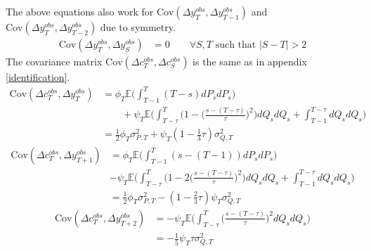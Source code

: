 The above equations also work for $\mathrm{Cov}(\Delta y^{obs}_T, \Delta y^{obs}_{T-1})$ and $\mathrm{Cov}(\Delta y^{obs}_T, \Delta y^{obs}_{T-2})$ due to symmetry.
\begin{align}
\mathrm{Cov}(\Delta y^{obs}_T, \Delta y^{obs}_{S}) &= 0 \qquad \forall S,T \text{ such that }|S-T| >2 
\end{align}
The covariance matrix $\mathrm{Cov}(\Delta c^{obs}_T, \Delta c^{obs}_{S})$ is the same as in appendix \ref{identification}.
\begin{align}
\mathrm{Cov}(\Delta c^{obs}_T, \Delta y^{obs}_T) &= \phi_T \mathbb{E} \Big(  \int_{T-1}^{T} (T-s) dP_s dP_s \Big) \nonumber \\
& \qquad +  \psi_T \mathbb{E} \Big(\int_{T-\tau}^{T} \Big( 1 - \Big(\frac{s-(T-\tau)}{\tau}\Big)^2\Big) dQ_s dQ_s  + \int_{T-1}^{T-\tau} dQ_s dQ_s\Big) \nonumber \\
&= \frac{1}{2} \phi_T \sigma^2_{P,T} + \psi_T  (1-\frac{1}{3}\tau )\sigma^2_{Q,T} 
\end{align}
\begin{align}
\mathrm{Cov}(\Delta c^{obs}_T, \Delta y^{obs}_{T+1}) &=  \phi_T \mathbb{E} \Big(  \int_{T-1}^{T} (s-(T-1)) dP_s dP_s \Big) \nonumber \\
&  -\psi_T \mathbb{E} \Big(  \int_{T-\tau}^{T}\Big( 1 - 2\Big(\frac{s-(T-\tau)}{\tau}\Big)^2\Big)  dQ_s dQ_s + \int_{T-1}^{T-\tau}  dQ_s dQ_s \Big) \nonumber \\
&= \frac{1}{2} \phi_T \sigma^2_{P,T} - (1-\frac{2}{3}\tau) \psi_T \sigma^2_{Q,T} 
\end{align}
\begin{align}
\mathrm{Cov}(\Delta c^{obs}_T, \Delta y^{obs}_{T+2}) &=  -\psi_T \mathbb{E} \Big(  \int_{T-\tau}^{T} \Big(\frac{s-(T-\tau)}{\tau}\Big)^2 dQ_s dQ_s\Big) \nonumber \\
&= -\frac{1}{5}\psi_T  \tau \sigma^2_{Q,T}
\end{align}

